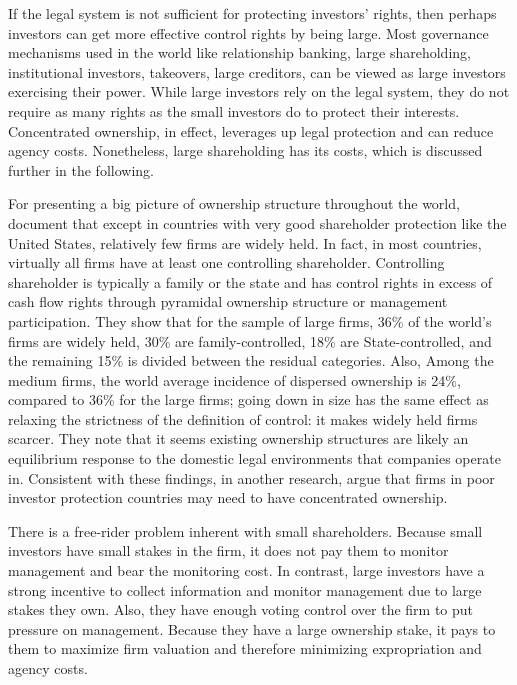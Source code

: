 \documentclass[final,1p,authoryear]{elsarticle}
\begin{document}
If the legal system is not sufficient for protecting investors’ rights, then perhaps investors can get more effective control rights by being large. Most governance mechanisms used in the world like relationship banking, large shareholding, institutional investors, takeovers, large creditors, can be viewed as large investors exercising their power. While large investors rely on the legal system, they do not require as many rights as the small investors do to protect their interests. Concentrated ownership, in effect, leverages up legal protection and can reduce agency costs. Nonetheless, large shareholding has its costs, which is discussed further in the following.

For presenting a big picture of ownership structure throughout the world, \cite{doi:10.1111/0022-1082.00115} document that except in countries with very good shareholder protection like the United States, relatively few firms are widely held. In fact, in most countries, virtually all firms have at least one controlling shareholder. Controlling shareholder is typically a family or the state and has control rights in excess of cash flow rights through pyramidal ownership structure or management participation. They show that for the sample of large firms, 36\% of the world's firms are widely held, 30\% are family-controlled, 18\% are State-controlled, and the remaining 15\% is divided between the residual categories. Also, Among the medium firms, the world average incidence of dispersed ownership is 24\%, compared to 36\% for the large firms; going down in size has the same effect as relaxing the strictness of the definition of control: it makes widely held firms scarcer. They note that it seems existing ownership structures are likely an equilibrium response to the domestic legal environments that companies operate in. Consistent with these findings, in another research, \cite{19455} argue that firms in poor investor protection countries may need to have concentrated ownership.

There is a free-rider problem inherent with small shareholders. Because small investors have small stakes in the firm, it does not pay them to monitor management and bear the monitoring cost. In contrast, large investors have a strong incentive to collect information and monitor management due to large stakes they own. Also, they have enough voting control over the firm to put pressure on management. Because they have a large ownership stake, it pays to them to maximize firm valuation and therefore minimizing expropriation and agency costs.
\end{document}
